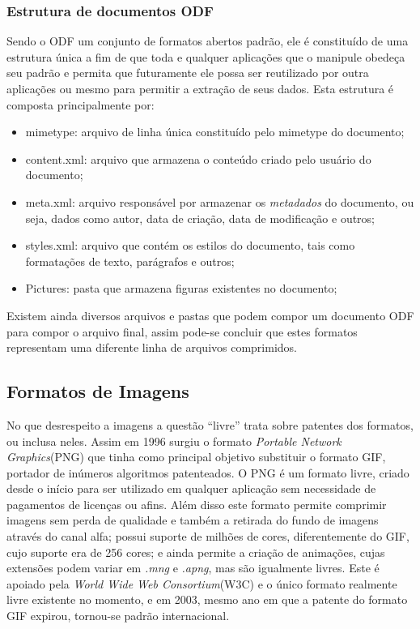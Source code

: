 \subsubsection{Estrutura de documentos ODF}
Sendo o ODF um conjunto de formatos abertos padrão, ele é constituído de uma estrutura única a fim de que toda e qualquer aplicações que o manipule obedeça seu padrão e permita que futuramente ele possa ser reutilizado por outra aplicações ou mesmo para permitir a extração de seus dados.
Esta estrutura é composta principalmente por:
\begin{itemize}
    \item{mimetype: arquivo de linha única constituído pelo mimetype do documento;}
  \item{content.xml: arquivo que armazena o conteúdo criado pelo usuário do documento;}
    \item{meta.xml: arquivo responsável por armazenar os \textit{metadados} do documento, ou seja, dados como autor, data de criação, data de modificação e outros;}
    \item{styles.xml: arquivo que contém os estilos do documento, tais como formatações de texto, parágrafos e outros;}
    \item{Pictures: pasta que armazena figuras existentes no documento;}
\end{itemize}
Existem ainda diversos arquivos e pastas que podem compor um documento ODF para compor o arquivo final, assim pode-se concluir que estes formatos representam uma diferente linha de arquivos comprimidos.

\subsection{Formatos de Imagens}
No que desrespeito a imagens a questão “livre” trata sobre patentes dos formatos, ou inclusa neles. Assim em 1996 surgiu o formato \textit{Portable Network Graphics}(PNG) que tinha como principal objetivo substituir o formato GIF, portador de inúmeros algoritmos patenteados.
O PNG é um formato livre, criado desde o início para ser utilizado em qualquer aplicação sem necessidade de pagamentos de licenças ou afins\cite{ALECRIM 2011}.
Além disso este formato permite comprimir imagens sem perda de qualidade e também a retirada do fundo de imagens através do canal alfa; possui suporte de milhões de cores, diferentemente do GIF, cujo suporte era de 256 cores; e ainda permite a criação de animações, cujas extensões podem variar em \textit{.mng} e \textit{.apng}, mas são igualmente livres.
Este é apoiado pela \textit{World Wide Web Consortium}(W3C) e o único formato realmente livre existente no momento, e em 2003, mesmo ano em que a patente do formato GIF expirou, tornou-se padrão internacional.

